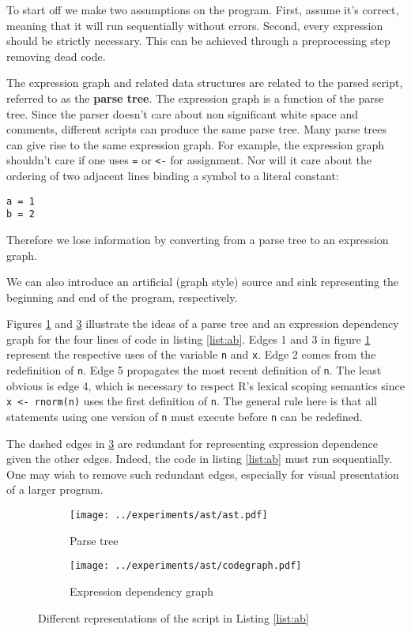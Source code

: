 \documentclass[12pt]{article}
\begin{document}
To start off we make two assumptions on the program. First, assume it's
correct, meaning that it will run sequentially without errors.
Second, every expression should be strictly necessary. This can be achieved
through a preprocessing step removing dead code.

The expression graph and related data structures are related to the parsed
script, referred to as the \textbf{parse tree}. The expression
graph is a function of the parse tree. Since the parser
doesn't care about non significant white space and comments,  different
scripts can produce the same parse tree.  Many parse trees can give rise to
the same expression graph. For example, the expression graph shouldn't care if one uses
\texttt{=} or \texttt{<-} for assignment. Nor will it care about the
ordering of two adjacent lines binding a symbol to a literal constant:

\begin{verbatim}
a = 1
b = 2
\end{verbatim}

Therefore we lose information by converting from a parse tree to an
expression graph.

We can also introduce an artificial (graph style) source and sink representing the
beginning and end of the program, respectively.

Figures \ref{fig:ast} and \ref{fig:codegraph} illustrate the ideas of a
parse tree and an expression dependency graph for the four lines of code in
listing \ref{list:ab}.  Edges 1 and 3 in figure \ref{fig:ast} represent the
respective uses of the variable \texttt{n} and \texttt{x}.  Edge 2 comes
from the redefinition of \texttt{n}.  Edge 5 propagates the most recent
definition of \texttt{n}.  The least obvious is edge 4, which is necessary
to respect R's lexical scoping semantics since \texttt{x <- rnorm(n)} uses
the first definition of \texttt{n}. The general rule here is that all
statements using one version of \texttt{n} must execute before \texttt{n}
can be redefined.

The dashed edges in \ref{fig:codegraph} are redundant for representing
expression dependence given the other edges. Indeed, the code in
listing \ref{list:ab} must run sequentially. One may wish to remove such
redundant edges, especially for visual presentation of a larger program.



\begin{figure}
\centering
\begin{subfigure}{.6\textwidth}
    \centering
    \texttt{[image: ../experiments/ast/ast.pdf]}
    \caption{Parse tree}
    \label{fig:ast}
\end{subfigure}%
\begin{subfigure}{.4\textwidth}
  \centering
  \texttt{[image: ../experiments/ast/codegraph.pdf]}
  \caption{Expression dependency graph}
  \label{fig:codegraph}
\end{subfigure}
\caption{Different representations of the script in Listing \ref{list:ab}}
\end{figure}
\end{document}
